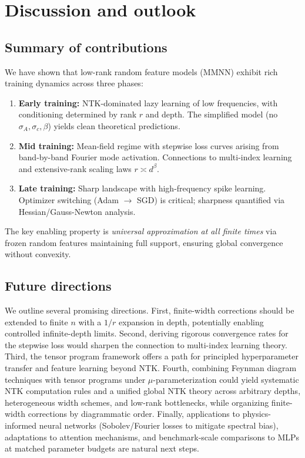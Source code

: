 \documentclass{article}
\begin{document}
\vspace{2em}
\section{Discussion and outlook}

\vspace{1em}
\subsection{Summary of contributions}
We have shown that low-rank random feature models (MMNN) exhibit rich training dynamics across three phases:
\begin{enumerate}
    \item \textbf{Early training:} NTK-dominated lazy learning of low frequencies, with conditioning determined by rank \( r \) and depth. The simplified model (no \( \sigma_A, \sigma_c, \beta \)) yields clean theoretical predictions.
    \item \textbf{Mid training:} Mean-field regime with stepwise loss curves arising from band-by-band Fourier mode activation. Connections to multi-index learning and extensive-rank scaling laws \( r \asymp d^\beta \).
    \item \textbf{Late training:} Sharp landscape with high-frequency spike learning. Optimizer switching (Adam \( \to \) SGD) is critical; sharpness quantified via Hessian/Gauss-Newton analysis.
\end{enumerate}
The key enabling property is \emph{universal approximation at all finite times} via frozen random features maintaining full support, ensuring global convergence without convexity.

\vspace{1em}
\subsection{Future directions}
We outline several promising directions. First, finite-width corrections should be extended to finite \( n \) with a \( 1/r \) expansion in depth, potentially enabling controlled infinite-depth limits. Second, deriving rigorous convergence rates for the stepwise loss would sharpen the connection to multi-index learning theory. Third, the tensor program framework offers a path for principled hyperparameter transfer and feature learning beyond NTK. Fourth, combining Feynman diagram techniques with tensor programs under \( \mu \)-parameterization could yield systematic NTK computation rules and a unified global NTK theory across arbitrary depths, heterogeneous width schemes, and low-rank bottlenecks, while organizing finite-width corrections by diagrammatic order. Finally, applications to physics-informed neural networks (Sobolev/Fourier losses to mitigate spectral bias), adaptations to attention mechanisms, and benchmark-scale comparisons to MLPs at matched parameter budgets are natural next steps.
\end{document}

